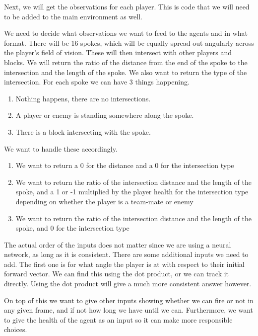 Next, we will get the observations for each player. This is code that we will need to be added to the main environment as well.

\vs
We need to decide what observations we want to feed to the agents and in what format. There will be 16 spokes, which will be equally spread out angularly across the player's field of vision. These will then intersect with other players and blocks. We will return the ratio of the distance from the end of the spoke to the intersection and the length of the spoke. We also want to return the type of the intersection. For each spoke we can have 3 things happening.

\begin{enumerate}[label=\arabic*.]
    \item Nothing happens, there are no intersections.
    \item A player or enemy is standing somewhere along the spoke.
    \item There is a block intersecting with the spoke.
\end{enumerate}

We want to handle these accordingly.

\begin{enumerate}[label=\arabic*.]
    \item We want to return a 0 for the distance and a 0 for the intersection type
    \item We want to return the ratio of the intersection distance and the length of the spoke, and a 1 or -1 multiplied by the player health for the intersection type depending on whether the player is a team-mate or enemy
    \item We want to return the ratio of the intersection distance and the length of the spoke, and 0 for the intersection type
\end{enumerate}

The actual order of the inputs does not matter since we are using a neural network, as long as it is consistent. There are some additional inputs we need to add. The first one is for what angle the player is at with respect to their initial forward vector. We can find this using the dot product, or we can track it directly. Using the dot product will give a much more consistent answer however.

\vs
On top of this we want to give other inputs showing whether we can fire or not in any given frame, and if not how long we have until we can. Furthermore, we want to give the health of the agent as an input so it can make more responsible choices.

